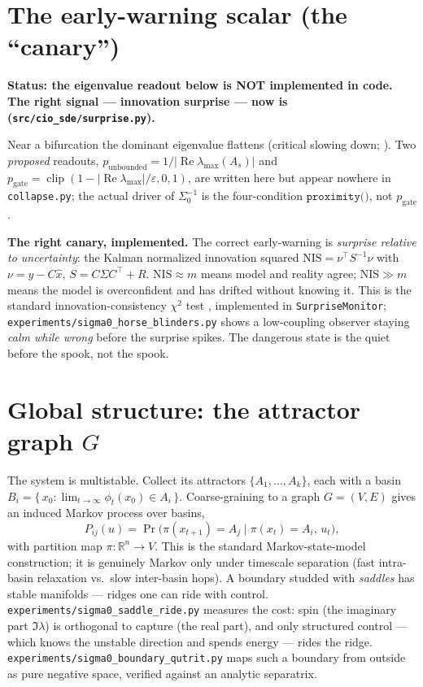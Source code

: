 \documentclass[11pt]{article}
\theoremstyle{definition}
\newcommand{\R}{\mathbb{R}}
\DeclareMathOperator*{\Real}{Re}
\begin{document}
\section{The early-warning scalar (the ``canary'')}
\begin{caveatbox}
\textbf{Status: the eigenvalue readout below is NOT implemented in code. The right
signal --- innovation surprise --- now is (\texttt{src/cio\_sde/surprise.py}).}
\end{caveatbox}
Near a bifurcation the dominant eigenvalue flattens (critical slowing down;
\cite{wissel1984,scheffer2009}). Two \emph{proposed} readouts,
$p_{\mathrm{unbounded}} = 1/|\Real\lambda_{\max}(A_s)|$ and
$p_{\mathrm{gate}} = \operatorname{clip}(1-|\Real\lambda_{\max}|/\varepsilon,0,1)$,
are written here but appear nowhere in \texttt{collapse.py}; the actual driver of
$\Sigma_0^{-1}$ is the four-condition $\texttt{proximity()}$, not $p_{\mathrm{gate}}$.

\begin{verifybox}
\textbf{The right canary, implemented.} The correct early-warning is \emph{surprise
relative to uncertainty}: the Kalman normalized innovation squared
$\mathrm{NIS}=\nu^\top S^{-1}\nu$ with $\nu=y-C\hat x$, $S=C\Sigma C^\top + R$.
$\mathrm{NIS}\approx m$ means model and reality agree; $\mathrm{NIS}\gg m$ means the
model is overconfident and has drifted without knowing it. This is the standard
innovation-consistency $\chi^2$ test \cite{barshalom2001}, implemented in
\texttt{SurpriseMonitor}; \texttt{experiments/sigma0\_horse\_blinders.py} shows a
low-coupling observer staying \emph{calm while wrong} before the surprise spikes.
The dangerous state is the quiet before the spook, not the spook.
\end{verifybox}

\section{Global structure: the attractor graph $G$}
The system is multistable. Collect its attractors $\{A_1,\dots,A_k\}$, each with a
basin $B_i = \{\, x_0 : \lim_{t\to\infty}\phi_t(x_0) \in A_i \,\}$. Coarse-graining
to a graph $G=(V,E)$ gives an induced Markov process over basins,
\begin{equation}
P_{ij}(u) = \Pr\!\big(\pi(x_{t+1}) = A_j \mid \pi(x_t) = A_i,\, u_t\big),
\end{equation}
with partition map $\pi:\R^n\to V$. This is the standard Markov-state-model
construction; it is genuinely Markov only under timescale separation (fast
intra-basin relaxation vs.\ slow inter-basin hops). A boundary studded with
\emph{saddles} has stable manifolds --- ridges one can ride with control.
\texttt{experiments/sigma0\_saddle\_ride.py} measures the cost: spin (the imaginary
part $\Im\lambda$) is orthogonal to capture (the real part), and only structured
control --- which knows the unstable direction and spends energy --- rides the
ridge. \texttt{experiments/sigma0\_boundary\_qutrit.py} maps such a boundary from
outside as pure negative space, verified against an analytic separatrix.
\end{document}
